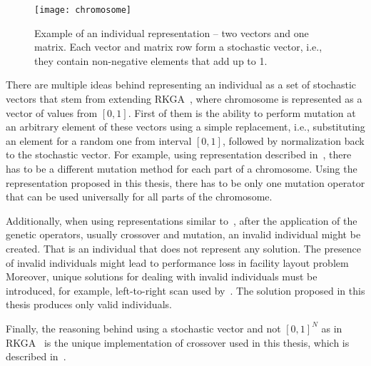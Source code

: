 \begin{figure}[htp]
    \texttt{[image: chromosome]}\caption[Example of an individual representation]{
        Example of an individual representation – two vectors and one matrix.
        Each vector and matrix row form a stochastic vector, i.e., they contain non-negative elements that add up to 1.
    }
    \label{fig:chromosome}
\end{figure}

There are multiple ideas behind representing an individual as a set of stochastic vectors that stem
from extending RKGA~\cite{beanGeneticAlgorithmsRandom1994}, where chromosome is represented as a vector of values from $[0,1]$. 
First of them is the ability to perform mutation at an arbitrary element of these vectors using
a simple replacement, i.e., substituting an element for a random one from interval $[0,1]$,
followed by normalization back to the stochastic vector.
For example, using representation described in~\cite{friedrichIntegratedSlicingTree2018, riponAdaptiveVariableNeighborhood2013},
there has to be a different mutation method for each part of a chromosome.
Using the representation proposed in this thesis, there has to be only one mutation operator that can be used universally for all parts of the chromosome.

Additionally, when using representations similar to~\cite{friedrichIntegratedSlicingTree2018, riponAdaptiveVariableNeighborhood2013},
after the application of the genetic operators, usually crossover and mutation, an invalid individual might be created.
That is an individual that does not represent any solution.
The presence of invalid individuals might lead to performance loss in facility layout problem~\cite{liuMultiimprovedGeneticAlgorithm2012}
Moreover, unique solutions for dealing with invalid individuals must be introduced, for example, left-to-right scan used by~\cite{hwangGeneticAlgorithmApproach2009, kandasamyEffectiveLocationMicro2020}.
The solution proposed in this thesis produces only valid individuals.

Finally, the reasoning behind using a stochastic vector and not $[0,1]^N$ as in RKGA~\cite{beanGeneticAlgorithmsRandom1994}
is the unique implementation of crossover used in this thesis, which is described in~\cite{subsec:crossover}.

